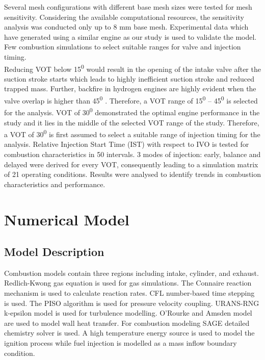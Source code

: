 \documentclass[conference]{IEEEtran}
\begin{document}
Several mesh configurations with different base mesh sizes were tested for mesh sensitivity.
Considering the available computational resources, the sensitivity analysis was conducted only up to 8 mm base mesh.
Experimental data which have generated using a similar engine as our study \cite{b10} is used to validate the model.
Few combustion simulations to select suitable ranges for valve and injection timing.\\

Reducing VOT below 15\textsuperscript{0} would result in the opening of the intake valve after the suction stroke starts which leads to highly inefficient suction stroke and reduced trapped mass.
Further, backfire in hydrogen engines are highly evident when the valve overlap is higher than 45\textsuperscript{0} \cite{b7,b10}.
Therefore, a VOT range of 15\textsuperscript{0} – 45\textsuperscript{0} is selected for the analysis.
VOT of 30\textsuperscript{0} demonstrated the optimal engine performance in the study \cite{b7} and it lies in the middle of the selected VOT range of the study.
Therefore, a VOT of 30\textsuperscript{0} is first assumed to select a suitable range of injection timing for the analysis.
Relative Injection Start Time (IST) with respect to IVO is tested for combustion characteristics in 50 intervals.
3 modes of injection: early, balance and delayed were derived for every VOT, consequently leading to a simulation matrix of 21 operating conditions.
Results were analysed to identify trends in combustion characteristics and performance.

\section{Numerical Model}
\subsection{Model Description}
Combustion models contain three regions including intake, cylinder, and exhaust. Redlich-Kwong gas equation is used for gas simulations. The Connaire reaction mechanism is used to calculate reaction rates. CFL number-based time stepping is used. The PISO algorithm is used for pressure velocity coupling. URANS-RNG k-epsilon model is used for turbulence modelling. O’Rourke and Amsden model are used to model wall heat transfer. For combustion modeling SAGE detailed chemistry solver is used. 
A high temperature energy source is used to model the ignition process while fuel injection is modelled as a mass inflow boundary condition.
\end{document}

